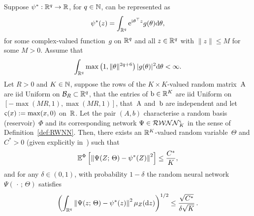 \begin{proposition}\label{prop:UATRWNN}
Suppose $\psi^{*}: \mathbb{R}^{q} \rightarrow \mathbb{R}$, for $q\in\mathbb{N}$, can be represented as
$$
\psi^{*}(z)=\int_{\mathbb{R}^{q}} \mathrm{e}^{{\mathrm{i}\mkern1mu}\theta^\top z} g(\theta) \mathrm{d} \theta,
$$
for some complex-valued function~$g$ on $\mathbb{R}^{q}$ and all $z \in \mathbb{R}^{q}$ with $\|z\| \leq M$ for some $M>0$. Assume that
$$
\int_{\mathbb{R}^{q}} \max \left(1,\|\theta \|^{2 q+6}\right)|g(\theta)|^{2} \mathrm{d} \theta <\infty .
$$
Let $R>0$ and $K\in\mathbb{N}$, suppose the rows of the $K\times K$-valued random matrix~$\mathrm{A}$ are iid Uniform on $\mathcal{B}_{R} \subset \mathbb{R}^{q}$, that the entries of $\mathrm{b}\in\mathbb{R}^{K}$ are iid Uniform on $[-\max (M R, 1), \max (M R, 1)]$, 
that~$\mathrm{A}$ and~$\mathrm{b}$ are independent and let $\varsigma(x):=\max (x, 0)$ on~$\mathbb{R}$. 
Let the pair $(A,b)$ characterise a random basis (reservoir)~$\Phi$ and its corresponding network $\Psi\in\mathcal{RWNN}^{\varsigma}_K$ in the sense of Definition~\ref{def:RWNN}. 
Then, there exists an $\mathbb{R}^K$-valued random variable~$\Theta$ and $C^{*}>0$ 
(given explicitly in~\cite[Equation~(33)]{Gonon2020ApproximationSystems}) such that
$$
\mathbb{E}^\Phi\left[\left\|\Psi(Z;\, \Theta)-\psi^{*}(Z)\right\|^{2}\right] \leq \frac{C^{*}}{K},
$$
and for any $\delta \in(0,1)$, with probability $1-\delta$ the random neural network $\Psi(\,\cdot\,;\,\Theta)$ satisfies
$$
\left(\int_{\mathbb{R}^{q}}\left\|\Psi(z;\, \Theta)-\psi^{*}(z)\right\|^{2} \mu_{Z}(\mathrm{d} z)\right)^{1 / 2} \leq \frac{\sqrt{C^{*}}}{\delta \sqrt{K}}\,.
$$
\end{proposition}

